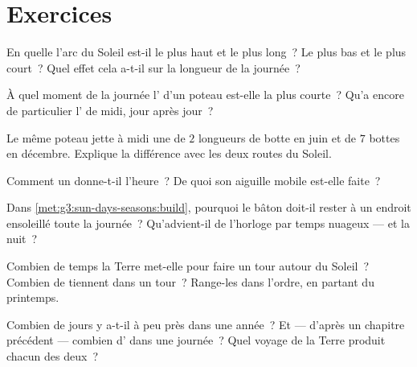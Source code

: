 \section{Exercices}

\begin{exercise}[$\star$]\label{exo:g3:sun-days-seasons:1}
En quelle  l'arc du Soleil est-il le plus haut et le plus
long~? Le plus bas et le plus court~? Quel effet cela a-t-il sur la
longueur de la journée~?
\end{exercise}

\begin{exercise}[$\star$]\label{exo:g3:sun-days-seasons:2}
À quel moment de la journée l' d'un poteau est-elle la plus
courte~? Qu'a encore de particulier l' de midi, jour après
jour~?
\end{exercise}

\begin{exercise}[$\star$]\label{exo:g3:sun-days-seasons:3}
Le même poteau jette à midi une  de $2$ longueurs de botte en
juin et de $7$ bottes en décembre. Explique la différence avec les
deux routes du Soleil.
\end{exercise}

\begin{exercise}[$\star$]\label{exo:g3:sun-days-seasons:4}
Comment un  donne-t-il l'heure~? De quoi son aiguille
mobile est-elle faite~?
\end{exercise}

\begin{exercise}[$\star$]\label{exo:g3:sun-days-seasons:5}
Dans \cref{met:g3:sun-days-seasons:build}, pourquoi le bâton
doit-il rester à un endroit ensoleillé toute la journée~? Qu'advient-il
de l'horloge par temps nuageux --- et la nuit~?
\end{exercise}

\begin{exercise}[$\star$]\label{exo:g3:sun-days-seasons:6}
Combien de temps la Terre met-elle pour faire un tour autour du
Soleil~? Combien de  tiennent dans un tour~? Range-les dans
l'ordre, en partant du printemps.
\end{exercise}

\begin{exercise}[$\star$]\label{exo:g3:sun-days-seasons:7}
Combien de jours y a-t-il à peu près dans une année~? Et --- d'après
un chapitre précédent --- combien d' dans une journée~? Quel
voyage de la Terre produit chacun des deux~?
\end{exercise}

